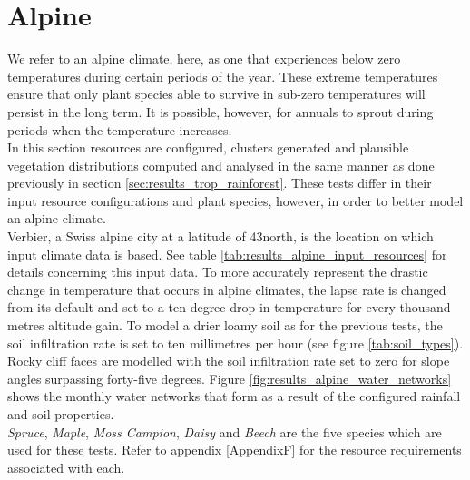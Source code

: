 \section{Alpine}

We refer to an alpine climate, here, as one that experiences below zero temperatures during certain periods of the year. These extreme temperatures ensure that only plant species able to survive in sub-zero temperatures will persist in the long term. It is possible, however, for annuals to sprout during periods when the temperature increases.\\

In this section resources are configured, clusters generated and plausible vegetation distributions computed and analysed in the same manner as done previously in section \ref{sec:results_trop_rainforest}. These tests differ in their input resource configurations and plant species, however, in order to better model an alpine climate. \\
Verbier, a Swiss alpine city at a latitude of 43\textdegree north, is the location on which input climate data is based. See table \ref{tab:results_alpine_input_resources} for details concerning this input data. To more accurately represent the drastic change in temperature that occurs in alpine climates, the lapse rate is changed from its default and set to a ten degree drop in temperature for every thousand metres altitude gain. To model a drier loamy soil as for the previous tests, the soil infiltration rate is set to ten millimetres per hour (see figure \ref{tab:soil_types}). Rocky cliff faces are modelled with the soil infiltration rate set to zero for slope angles surpassing forty-five degrees. Figure \ref{fig:results_alpine_water_networks} shows the monthly water networks that form as a result of the configured rainfall and soil properties. \\
\textit{Spruce}, \textit{Maple}, \textit{Moss Campion}, \textit{Daisy} and \textit{Beech} are the five species which are used for these tests. Refer to appendix \ref{AppendixF} for the resource requirements associated with each.\\

